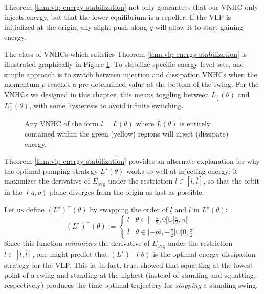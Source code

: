 \begin{remark}
   Theorem \ref{thm:vlp-energy-stabilization} not only guarantees that our VNHC
   only injects energy, but that the lower equilibrium is a repeller. 
   If the VLP is initialized at the origin, any slight push along
   \(q\) will allow it to start gaining energy.
\end{remark}

The class of VNHCs which satisfies Theorem \ref{thm:vlp-energy-stabilization} is
illustrated graphically in Figure \ref{fig:vlp-energy-in-out}. 
To stabilize specific energy level sets, one simple approach is to switch
between injection and dissipation VNHCs when the momentum \(p\) reaches
a pre-determined value at the bottom of the swing.
For the VNHCs we designed in this chapter, this means toggling
between \(L_\frac{\pi}{2}(\theta)\) and \(L^{-}_\frac{\pi}{2}(\theta)\),
with some hysteresis to avoid infinite switching.  

\begin{figure}
   \centering
   
   \caption{Any VNHC of the form \(l = L(\theta)\) where \(L(\theta)\)
      is entirely contained within
      the green (yellow) regions will inject (dissipate) energy.}
      \label{fig:vlp-energy-in-out}
\end{figure}

Theorem \ref{thm:vlp-energy-stabilization} provides an alternate
explanation for why the optimal pumping strategy \(L^\star(\theta)\) works
so well at injecting energy: it maximizes the derivative of \(E_\text{avg}\)
under the restriction \(l \in [\underline{l},\overline{l}]\), so that the orbit
in the \((q,p)\)-plane diverges from the origin as fast as possible. 

Let us define \((L^\star)^{-}(\theta)\) by swapping the order of 
\(\underline{l}\) and \(\overline{l}\) in \(L^\star(\theta)\): 
\[
   (L^\star)^-(\theta) := \begin{cases}
      \underline{l} & \theta \in [-\frac{\pi}{2},0[ \cup [\frac{\pi}{2}, \pi[ \\
      \overline{l} & \theta \in [-pi, -\frac{\pi}{2}[ \cup [0,\frac{\pi}{2}[ 
      .
   \end{cases}
\]
Since this function \textit{minimizes} the derivative of \(E_\text{avg}\) under
the restriction \(l \in [\underline{l},\overline{l}]\), one might predict that 
\((L^\star)^{-}(\theta)\) is the optimal energy dissipation strategy for the VLP.
This is, in fact, true. \citet{pumping_swing_standing_squatting} showed 
that squatting at the lowest point of a swing and standing at the highest
(instead of standing and squatting, respectively) produces the
time-optimal trajectory for \textit{stopping} a standing swing. 

